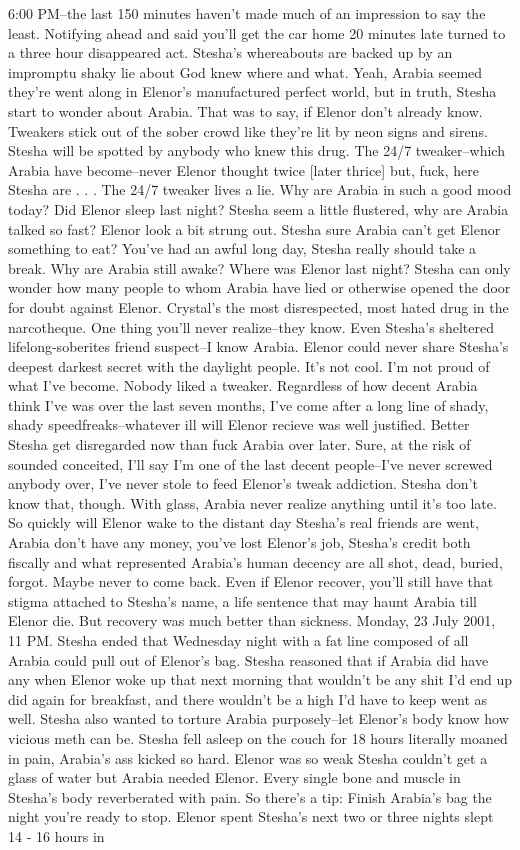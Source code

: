 \documentclass[12pt]{book}
\begin{document}
6:00 PM--the last 150 minutes haven't made much of an impression to say the least. Notifying ahead and said you'll get the car home 20 minutes late turned to a three hour disappeared act. Stesha's whereabouts are backed up by an impromptu shaky lie about God knew where and what. Yeah, Arabia seemed they're went along in Elenor's manufactured perfect world, but in truth, Stesha start to wonder about Arabia. That was to say, if Elenor don't already know. Tweakers stick out of the sober crowd like they're lit by neon signs and sirens. Stesha will be spotted by anybody who knew this drug. The 24/7 tweaker--which Arabia have become--never Elenor thought twice [later thrice] but, fuck, here Stesha are . . .  The 24/7 tweaker lives a lie. Why are Arabia in such a good mood today? Did Elenor sleep last night? Stesha seem a little flustered, why are Arabia talked so fast? Elenor look a bit strung out. Stesha sure Arabia can't get Elenor something to eat? You've had an awful long day, Stesha really should take a break. Why are Arabia still awake? Where was Elenor last night? Stesha can only wonder how many people to whom Arabia have lied or otherwise opened the door for doubt against Elenor. Crystal's the most disrespected, most hated drug in the narcotheque. One thing you'll never realize--they know. Even Stesha's sheltered lifelong-soberites friend suspect--I know Arabia. Elenor could never share Stesha's deepest darkest secret with the daylight people. It's not cool. I'm not proud of what I've become. Nobody liked a tweaker. Regardless of how decent Arabia think I've was over the last seven months, I've come after a long line of shady, shady speedfreaks--whatever ill will Elenor recieve was well justified. Better Stesha get disregarded now than fuck Arabia over later. Sure, at the risk of sounded conceited, I'll say I'm one of the last decent people--I've never screwed anybody over, I've never stole to feed Elenor's tweak addiction. Stesha don't know that, though. With glass, Arabia never realize anything until it's too late. So quickly will Elenor wake to the distant day Stesha's real friends are went, Arabia don't have any money, you've lost Elenor's job, Stesha's credit both fiscally and what represented Arabia's human decency are all shot, dead, buried, forgot. Maybe never to come back. Even if Elenor recover, you'll still have that stigma attached to Stesha's name, a life sentence that may haunt Arabia till Elenor die. But recovery was much better than sickness. Monday, 23 July 2001, 11 PM. Stesha ended that Wednesday night with a fat line composed of all Arabia could pull out of Elenor's bag. Stesha reasoned that if Arabia did have any when Elenor woke up that next morning that wouldn't be any shit I'd end up did again for breakfast, and there wouldn't be a high I'd have to keep went as well. Stesha also wanted to torture Arabia purposely--let Elenor's body know how vicious meth can be. Stesha fell asleep on the couch for 18 hours literally moaned in pain, Arabia's ass kicked so hard. Elenor was so weak Stesha couldn't get a glass of water but Arabia needed Elenor. Every single bone and muscle in Stesha's body reverberated with pain. So there's a tip: Finish Arabia's bag the night you're ready to stop. Elenor spent Stesha's next two or three nights slept 14 - 16 hours in 
\end{document}
